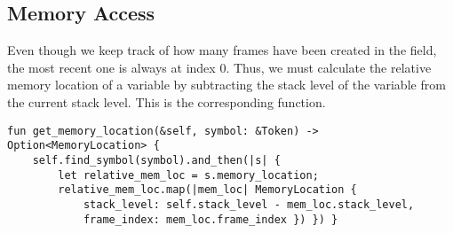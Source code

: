 \subsection{Memory Access}

Even though we keep track of how many frames have been created in the
 field, the most recent one is always at index 0. Thus, we
must calculate the relative memory location of a variable by subtracting the
stack level of the variable from the current stack level. This is the corresponding function.


    {

        \lstset{xleftmargin=0\textwidth,aboveskip=0pt,belowskip=0pt}

        \begin{lstlisting}
fun get_memory_location(&self, symbol: &Token) -> Option<MemoryLocation> {
    self.find_symbol(symbol).and_then(|s| {
        let relative_mem_loc = s.memory_location;
        relative_mem_loc.map(|mem_loc| MemoryLocation {
            stack_level: self.stack_level - mem_loc.stack_level,
            frame_index: mem_loc.frame_index }) }) }
\end{lstlisting}

    }
